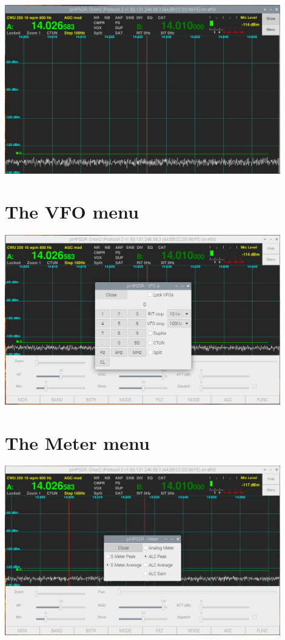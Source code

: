 \documentclass[12pt]{book}
\begin{document}
\begin{center}
\includegraphics[width=12cm]{Hidden.png}
\end{center}

\section{The VFO menu}
\begin{center}
\includegraphics[width=12cm]{VFOmenu.png}
\end{center}

\section{The Meter menu}
\begin{center}
\includegraphics[width=12cm]{MeterMenu.png}
\end{center}
\end{document}

